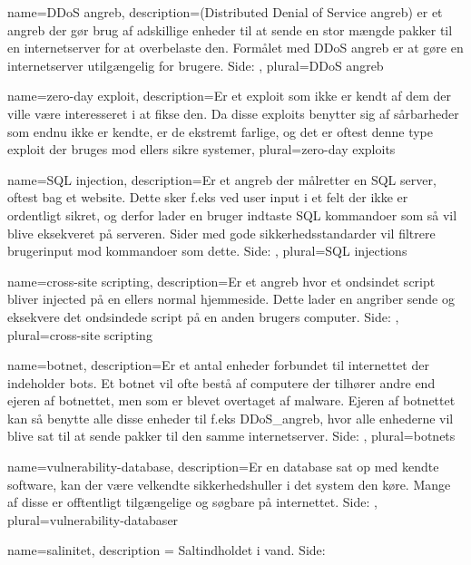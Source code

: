 \makeglossaries

{
    name={DDoS angreb},
    description={(Distributed Denial of Service angreb) er et angreb der gør brug af adskillige enheder til at sende en stor mængde pakker til en internetserver for at overbelaste den. Formålet med DDoS angreb er at gøre en internetserver utilgængelig for brugere.  Side: },
    plural={DDoS angreb}
}

{
    name={zero-day exploit},
    description={Er et exploit som ikke er kendt af dem der ville være interesseret i at fikse den. Da disse exploits benytter sig af sårbarheder som endnu ikke er kendte, er de ekstremt farlige, og det er oftest denne type exploit der bruges mod ellers sikre systemer},
    plural={zero-day exploits}
}

{
    name={SQL injection},
    description={Er et angreb der målretter en SQL server, oftest bag et website. Dette sker f.eks ved user input i et felt der ikke er ordentligt sikret, og derfor lader en bruger indtaste SQL kommandoer som så vil blive eksekveret på serveren. Sider med gode sikkerhedsstandarder vil filtrere brugerinput mod kommandoer som dette.  Side: },
    plural={SQL injections}
}

{
    name={cross-site scripting},
    description={Er et angreb hvor et ondsindet script bliver injected på en ellers normal hjemmeside. Dette lader en angriber sende og eksekvere det ondsindede script på en anden brugers computer. Side: },
    plural={cross-site scripting}
}

{
    name={botnet},
    description={Er et antal enheder forbundet til internettet der indeholder bots. Et botnet vil ofte bestå af computere der tilhører andre end ejeren af botnettet, men som er blevet overtaget af malware. Ejeren af botnettet kan så benytte alle disse enheder til f.eks \Gls{DDoS_angreb}, hvor alle enhederne vil blive sat til at sende pakker til den samme internetserver. Side: }, 
    plural={botnets}
}

{
    name={vulnerability-database},
    description={Er en database sat op med kendte software, kan der være velkendte sikkerhedshuller i det system den køre. Mange af disse er offtentligt tilgængelige og søgbare på internettet.  Side: }, 
    plural={vulnerability-databaser}
}

{
    name={salinitet},
    description = {Saltindholdet i vand. Side: }
}